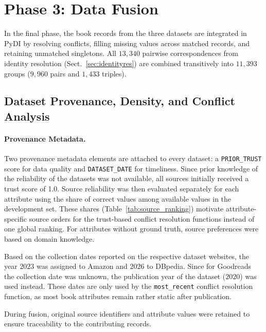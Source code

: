 \documentclass[runningheads]{llncs}
\begin{document}
\section{Phase 3: Data Fusion}
In the final phase, the book records from the three datasets are integrated in PyDI by resolving conflicts, filling missing values across matched records, and retaining unmatched singletons. All $13,340$ pairwise correspondences from identity resolution (Sect.~\ref{sec:identityres}) are combined transitively into $11,393$ groups ($9,960$ pairs and $1,433$ triples). %

\subsection{Dataset Provenance, Density, and Conflict Analysis}

\paragraph{Provenance Metadata.}
Two provenance metadata elements are attached to every dataset: a \texttt{PRIOR\_TRUST} score for data quality and \texttt{DATASET\_DATE} for timeliness. Since prior knowledge of the reliability of the datasets was not available, all sources initially received a trust score of 1.0. %
Source reliability was then evaluated separately for each attribute using the share of correct values among available values in the development set. These shares (Table~\ref{tab:source_ranking}) motivate attribute-specific source orders for the trust-based conflict resolution functions instead of one global ranking. For attributes without ground truth, source preferences were based on domain knowledge.

Based on the collection dates reported on the respective dataset websites, the year $2023$ was assigned to Amazon and $2026$ to DBpedia. Since for Goodreads the collection date was unknown, the publication year of the dataset ($2020$) was used instead. These dates are only used by the \texttt{most\_recent} conflict resolution function, as most book attributes remain rather static after publication.

During fusion, original source identifiers and attribute values were retained to ensure traceability to the contributing records.
\end{document}
